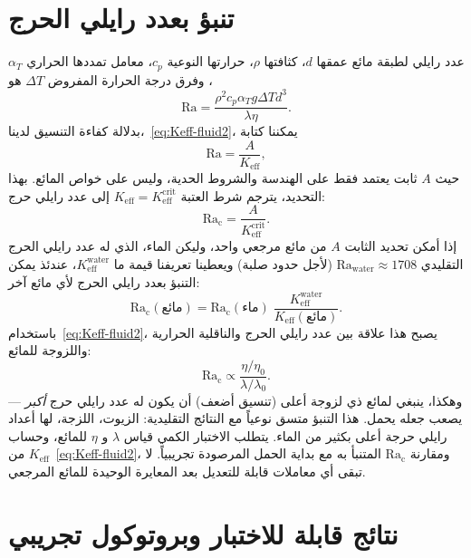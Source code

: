 \documentclass[12pt,a4paper]{article}
\begin{document}
	\section{تنبؤ بعدد رايلي الحرج}
	عدد رايلي لطبقة مائع عمقها \(d\)، كثافتها \(\rho\)، حرارتها النوعية \(c_p\)، معامل تمددها الحراري \(\alpha_T\)، وفرق درجة الحرارة المفروض \(\Delta T\) هو
	\begin{equation}
		\mathrm{Ra} = \frac{\rho^2 c_p \alpha_T g \Delta T d^3}{\lambda \eta}.
	\end{equation}
	بدلالة كفاءة التنسيق لدينا،~\eqref{eq:Keff-fluid2}، يمكننا كتابة
	\begin{equation}
		\mathrm{Ra} = \frac{A}{K_{\mathrm{eff}}},
	\end{equation}
	حيث \(A\) ثابت يعتمد فقط على الهندسة والشروط الحدية، وليس على خواص المائع. بهذا التحديد، يترجم شرط العتبة \(K_{\mathrm{eff}} = K_{\mathrm{eff}}^{\mathrm{crit}}\) إلى عدد رايلي حرج:
	\begin{equation}\label{eq:Racrit}
		\mathrm{Ra_c} = \frac{A}{K_{\mathrm{eff}}^{\mathrm{crit}}}.
	\end{equation}
	إذا أمكن تحديد الثابت \(A\) من مائع مرجعي واحد، وليكن الماء، الذي له عدد رايلي الحرج التقليدي \(\mathrm{Ra}_{\mathrm{water}} \approx 1708\) (لأجل حدود صلبة) ويعطينا تعريفنا قيمة ما \(K_{\mathrm{eff}}^{\mathrm{water}}\)، عندئذ يمكن التنبؤ بعدد رايلي الحرج لأي مائع آخر:
	\begin{equation}\label{eq:Racrit-predict}
		\boxed{ \mathrm{Ra_c}(\text{مائع}) = \mathrm{Ra_c}(\text{ماء}) \;
			\frac{K_{\mathrm{eff}}^{\mathrm{water}}}{K_{\mathrm{eff}}(\text{مائع})} }.
	\end{equation}
	باستخدام~\eqref{eq:Keff-fluid2}، يصبح هذا علاقة بين عدد رايلي الحرج والناقلية الحرارية واللزوجة للمائع:
	\begin{equation}
		\mathrm{Ra_c} \propto \frac{\eta / \eta_0}{\lambda / \lambda_0}.
	\end{equation}
	وهكذا، ينبغي لمائع ذي لزوجة أعلى (تنسيق أضعف) أن يكون له عدد رايلي حرج \emph{أكبر} — يصعب جعله يحمل. هذا التنبؤ متسق نوعياً مع النتائج التقليدية: الزيوت، اللزجة، لها أعداد رايلي حرجة أعلى بكثير من الماء. يتطلب الاختبار الكمي قياس \(\lambda\) و \(\eta\) للمائع، وحساب \(K_{\mathrm{eff}}\) من~\eqref{eq:Keff-fluid2}، ومقارنة \(\mathrm{Ra_c}\) المتنبأ به مع بداية الحمل المرصودة تجريبياً. لا تبقى أي معاملات قابلة للتعديل بعد المعايرة الوحيدة للمائع المرجعي.
	
	\section{نتائج قابلة للاختبار وبروتوكول تجريبي}
\end{document}
